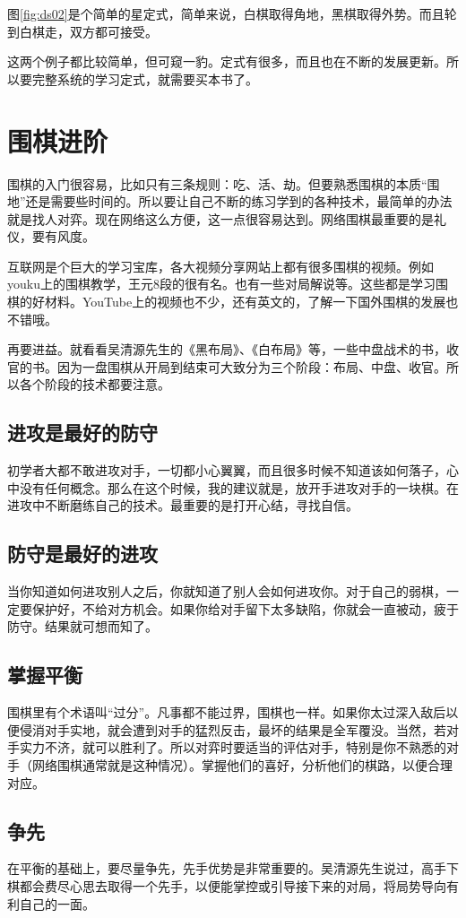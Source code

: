\documentclass[12pt，a4paper, titlepage]{article}
\begin{document}
图\ref{fig:ds02}是个简单的星定式，简单来说，白棋取得角地，黑棋取得外势。而且轮到白棋走，双方都可接受。

这两个例子都比较简单，但可窥一豹。定式有很多，而且也在不断的发展更新。所以要完整系统的学习定式，就需要买本书了。

\section{围棋进阶}
围棋的入门很容易，比如只有三条规则：吃、活、劫。但要熟悉围棋的本质“围地”还是需要些时间的。所以要让自己不断的练习学到的各种技术，最简单的办法就是找人对弈。现在网络这么方便，这一点很容易达到。网络围棋最重要的是礼仪，要有风度。

互联网是个巨大的学习宝库，各大视频分享网站上都有很多围棋的视频。例如youku上的围棋教学，王元8段的很有名。也有一些对局解说等。这些都是学习围棋的好材料。YouTube上的视频也不少，还有英文的，了解一下国外围棋的发展也不错哦。

再要进益。就看看吴清源先生的《黑布局》、《白布局》等，一些中盘战术的书，收官的书。因为一盘围棋从开局到结束可大致分为三个阶段：布局、中盘、收官。所以各个阶段的技术都要注意。

\subsection{进攻是最好的防守}
初学者大都不敢进攻对手，一切都小心翼翼，而且很多时候不知道该如何落子，心中没有任何概念。那么在这个时候，我的建议就是，放开手进攻对手的一块棋。在进攻中不断磨练自己的技术。最重要的是打开心结，寻找自信。

\subsection{防守是最好的进攻}
当你知道如何进攻别人之后，你就知道了别人会如何进攻你。对于自己的弱棋，一定要保护好，不给对方机会。如果你给对手留下太多缺陷，你就会一直被动，疲于防守。结果就可想而知了。

\subsection{掌握平衡}
围棋里有个术语叫“过分”。凡事都不能过界，围棋也一样。如果你太过深入敌后以便侵消对手实地，就会遭到对手的猛烈反击，最坏的结果是全军覆没。当然，若对手实力不济，就可以胜利了。所以对弈时要适当的评估对手，特别是你不熟悉的对手（网络围棋通常就是这种情况）。掌握他们的喜好，分析他们的棋路，以便合理对应。

\subsection{争先}
在平衡的基础上，要尽量争先，先手优势是非常重要的。吴清源先生说过，高手下棋都会费尽心思去取得一个先手，以便能掌控或引导接下来的对局，将局势导向有利自己的一面。
\end{document}
